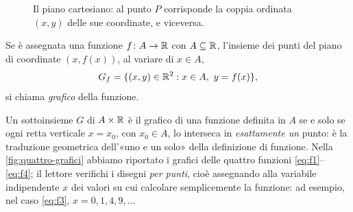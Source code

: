 \begin{figure}[htb]
\centering
{}
\caption{Il piano cartesiano: al punto $P$ corrisponde la coppia ordinata $(x,y)$ delle
sue coordinate, e viceversa.}
\label{fig:piano-cartesiano}
\end{figure}

\begin{definizione}[Grafico]
Se è assegnata una funzione $f\colon A\to\mathbb{R}$ con $A\subseteq\mathbb{R}$, l'insieme dei punti
del piano di coordinate $(x,f(x))$, al variare di $x\in A$,
\[
  G_{f}=\{(x,y)\in\R^{2} : x\in A,\ y=f(x)\},
\]
si chiama \emph{grafico} della funzione.
\end{definizione}

Un sottoinsieme $G$ di $A\times\mathbb{R}$ è il grafico di una funzione definita in $A$ se e
solo se ogni retta verticale $x=x_{0}$, con $x_{0}\in A$, lo interseca in
\emph{esattamente un} punto:
è la traduzione geometrica dell'«uno e un solo» della definizione di funzione. Nella
\cref{fig:quattro-grafici} abbiamo riportato i grafici delle quattro funzioni
\eqref{eq:f1}--\eqref{eq:f4}; il lettore verifichi i disegni \emph{per punti}, cioè
assegnando alla variabile indipendente $x$ dei valori su cui calcolare semplicemente la
funzione: ad esempio, nel caso \eqref{eq:f3}, $x=0,1,4,9,\dots$

